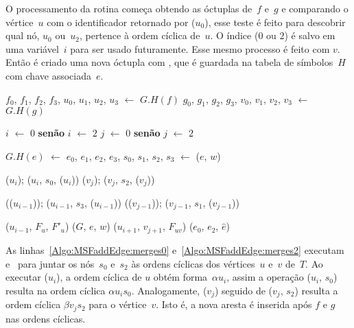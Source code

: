 O processamento da rotina \MSFaddEdge{} começa obtendo as óctuplas de~$f$ e~$g$ e comparando o vértice~$u$ com o identificador retornado por \LCOFindNode($u_{0}$), esse teste é feito para descobrir qual nó, $u_0$ ou~$u_2$, pertence à ordem cíclica de~$u$.
O índice ($0$ ou $2$) é salvo em uma variável~$i$ para ser usado futuramente.
Esse mesmo processo é feito com $v$.
Então é criado uma nova óctupla com \LCOMakeOcto{}, que é guardada na tabela de símbolos~$H$ com chave associada~$e$.


\begin{algorithm}[htb]
\caption{\MSFaddEdge($G$, $e$, $u$, $f$, $v$, $g$, $w$)}
\label{Algo:MSFaddEdge}
\begin{algorithmic}[1]

\State $f_0$, $f_1$, $f_2$, $f_3$, $u_0$, $u_1$, $u_2$, $u_3$ $\gets$ $G.H(f)$ \label{Algo:MSFaddEdge:linha:1}
\State $g_0$, $g_1$, $g_2$, $g_3$, $v_0$, $v_1$, $v_2$, $v_3$ $\gets$ $G.H(g)$ \label{Algo:MSFaddEdge:linha:2}

 $i$ $\gets$ $0$ \textbf{senão} $i$ $\gets$ $2$
\EndIf
{} $j$ $\gets$ $0$ \textbf{senão} $j$ $\gets$ $2$
\EndIf


\State $G.H(e)$ $\gets$ $e_0$, $e_1$, $e_2$, $e_3$, $s_0$, $s_1$, $s_2$, $s_3$ $\gets$ \LCOMakeOcto($e$, $w$) \label{Algo:MSFaddEdge:linha:const3}

\State \LCOCycle($u_i$); \LCOMerge($u_i$, $s_0$, \LCOFindNode($u_i$))\label{Algo:MSFaddEdge:merges0}
\State \LCOCycle($v_j$); \LCOMerge($v_j$, $s_2$, \LCOFindNode($v_j$))\label{Algo:MSFaddEdge:merges2}


\State \LCOCycle(\treapPredecessor($u_{i-1}$)); \LCOMerge($u_{i-1}$, $s_3$, \LCOFindNode($u_{i-1}$))\label{Algo:MSFaddEdge:merges1}
\State \LCOCycle(\treapPredecessor($v_{j-1}$)); \LCOMerge($v_{j-1}$, $s_1$, \LCOFindNode($v_{j-1}$))\label{Algo:MSFaddEdge:merges3}

\label{Algo:MSFaddEdge:linha:deteccao-caso}
\State \LCOSplit($u_{i-1}$, $F_u$, $F'_u$)\label{Algo:MSFaddEdge:linha:splitnaoponte}
\State \MSFupdate($G$, $e$, $w$)
\Else
\State \LCOMerge($u_{i+1}$, $v_{j+1}$, $F_{uv}$)\label{Algo:MSFaddEdge:linha:mergeponte}
\State \LCOMerge($e_0$, $e_2$, $\hat e$)
\EndIf
\end{algorithmic}
\end{algorithm}

As linhas~\ref{Algo:MSFaddEdge:merges0} e~\ref{Algo:MSFaddEdge:merges2} executam \LCOCycle{} e~\LCOMerge{} para juntar os nós~$s_0$ e~$s_2$ às ordens cíclicas dos vértices~$u$ e~$v$ de~$\hat T$.  
Ao executar \LCOCycle($u_i$), a ordem cíclica de $u$ obtém forma~$\alpha u_i$, assim a operação \LCOMerge($u_i$, $s_0$) resulta na ordem cíclica $\alpha u_is_0$.
Analogamente, \LCOCycle($v_j$) seguido de \LCOMerge($v_j$, $s_2$) resulta a ordem cíclica $\beta v_j s_2$ para o vértice~$v$.
Isto é, a nova aresta é inserida após $f$ e $g$ nas ordens cíclicas.

